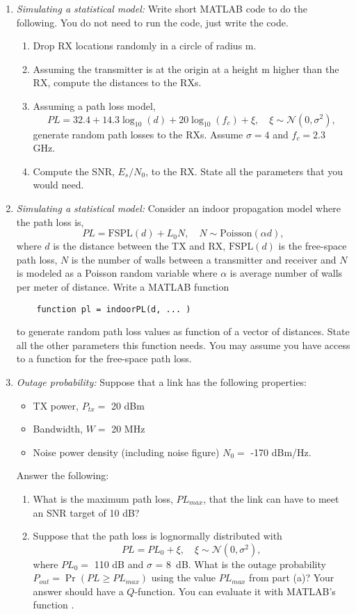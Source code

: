 \documentclass[11pt]{article}
\begin{document}
\begin{enumerate}
\item \emph{Simulating a statistical model:}  
Write short MATLAB code to do the following.  You do not need to run the code,
just write the code.
\begin{enumerate}[label=(\alph*)]
\item Drop  RX locations randomly in a circle of radius m.
\item Assuming the transmitter is at the origin at a height m higher
than the RX, compute the distances  to the RXs.
\item Assuming a path loss model,
\[
    PL = 32.4 + 14.3\log_{10}(d) + 20\log_{10}(f_c)  + \xi,
    \quad \xi \sim \mathcal{N}(0,\sigma^2),
\]
generate random path losses to the RXs.  Assume $\sigma = 4$ and 
$f_c = 2.3$ GHz.
\item Compute the SNR, $E_s/N_0$, to the RX.  State all the parameters that you would need.
\end{enumerate}


\item \emph{Simulating a statistical model:}
Consider an indoor propagation model where the path loss is,
\[
    PL = \mathrm{FSPL}(d) + L_0 N, \quad N \sim \mathrm{Poisson}(\alpha d),
\]
where $d$ is the distance between the TX and RX,
$\mathrm{FSPL}(d)$ is the free-space path loss, $N$ is 
the number of walls between a transmitter and receiver and $N$ is modeled as 
a Poisson random variable where $\alpha$ is average number of walls
per meter of distance.  
Write a MATLAB function 
\begin{lstlisting}
    function pl = indoorPL(d, ... )
\end{lstlisting}
to generate random path loss values as function of a vector of distances.  
State all the other parameters this function needs.  You may assume you have
access to a function  for the free-space path loss.
  
\item \emph{Outage probability:} Suppose that a link has the following properties:
\begin{itemize}
\item TX power, $P_{tx} =$ 20 dBm
\item Bandwidth, $W =$ 20 MHz
\item Noise power density (including noise figure) $N_0=$ -170 dBm/Hz.
\end{itemize}
Answer the following:
\begin{enumerate}[label=(\alph*)]
\item What is the maximum path loss, $PL_{max}$, that the link can
have to meet an SNR target of 10 dB?
\item Suppose that the path loss is lognormally distributed with
\[
    PL = PL_0 + \xi, \quad \xi \sim {\mathcal N}(0,\sigma^2),
\]
where $PL_0 = $ 110 dB and $\sigma$ = 8~dB.
What is the outage probability $P_{out}=\Pr(PL \geq PL_{max})$
using the value $PL_{max}$ from part (a)?
Your answer should have
a $Q$-function.  You can evaluate it with MATLAB's function .


\end{enumerate}
\end{enumerate}
\end{document}
